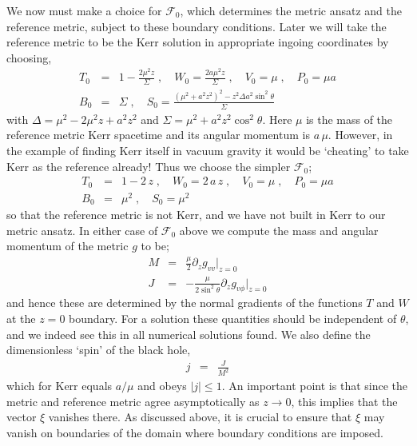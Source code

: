 \documentclass[12pt]{article}
\numberwithin{equation}{section}
\begin{document}
We now must make a choice for $\mathcal{F}_0$, which determines the metric ansatz and the reference metric, subject to these boundary conditions. Later we will take the reference metric to be the Kerr solution in appropriate ingoing coordinates by choosing,
\begin{eqnarray}
\label{eq:KerrRef}
T_0 &=& 1 - \frac{2 \mu^2 z}{\Sigma} \; , \quad W_0 = \frac{2 a \mu^2 z}{\Sigma} \; , \quad V_0 = \mu \; , \quad P_0 = \mu a \nonumber \\
B_0 &=& \Sigma \; , \quad  S_0 = \frac{\left( \mu^2 + a^2 z^2 \right)^2 - z^2 \Delta a^2 \sin^2\theta }{\Sigma}
\end{eqnarray}
with $\Delta = \mu^2 - 2 \mu^2 z + a^2 z^2$ and $\Sigma = \mu^2 + a^2 z^2 \cos^2\theta$. 
Here $\mu$ is the mass of the reference metric Kerr spacetime and its angular momentum is $a \, \mu$. 
%
However, in the example of finding Kerr itself in vacuum gravity it would be `cheating' to take Kerr as the reference already! Thus we choose the simpler $\mathcal{F}_0$;
\begin{eqnarray}
\label{eq:ExampleRef}
T_0 &=& 1 - 2\, z \; , \quad W_0 = 2\,a\,z \; , \quad V_0 = \mu \; , \quad P_0 = \mu a \nonumber \\
B_0 &=& \mu^2 \; , \quad  S_0 = \mu^2
\end{eqnarray}
so that the reference metric is not Kerr, and we have not built in Kerr to our metric ansatz.
In either case of $\mathcal{F}_0$ above we compute the mass and angular momentum of the metric $g$ to be;
\begin{eqnarray}
M & = & \frac{\mu}{2}  \partial_z g_{vv} \bigg|_{z=0} \nonumber \\
J & = & - \frac{\mu}{2 \sin^2\theta}  \partial_z g_{v\phi} \bigg|_{z=0} 
\end{eqnarray}
and hence these are determined by the normal gradients of the functions $T$ and $W$ at the $z=0$ boundary. For a solution these quantities should be independent of $\theta$, and we indeed see this in all numerical solutions found. 
We also define the dimensionless `spin' of the black hole,
\begin{eqnarray}
j & = & \frac{J}{M^2}
\end{eqnarray}
which for Kerr equals $a / \mu$ and obeys $| j | \le 1$. 
%
An important point is that since the metric and reference metric agree asymptotically as $z \to 0$, this implies that the vector $\xi$ vanishes there. As discussed above, it is crucial to ensure that $\xi$ may vanish on boundaries of the domain where boundary conditions are imposed. 
\end{document}
